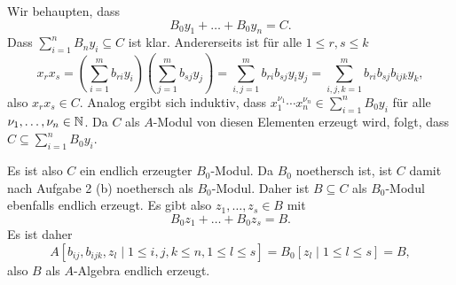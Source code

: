 \documentclass[a4paper,10pt]{article}
\begin{document}
Wir behaupten, dass
\[
 B_0 y_1 + \ldots + B_0 y_n = C.
\]
Dass $\sum_{i=1}^n B_n y_i \subseteq C$ ist klar. Andererseits ist für alle $1 \leq r,s \leq k$
\[
 x_r x_s
 = \left( \sum_{i=1}^m b_{ri} y_i \right) \left( \sum_{j=1}^m b_{sj} y_j \right)
 = \sum_{i,j=1}^m b_{ri} b_{sj} y_i y_j
 = \sum_{i,j,k=1}^m b_{ri} b_{sj} b_{ijk} y_k,
\]
also $x_r x_s \in C$. Analog ergibt sich induktiv, dass $x_1^{\nu_1} \cdots x_n^{\nu_n} \in \sum_{i=1}^n B_0 y_i$ für alle $\nu_1, \ldots, \nu_n \in \mathbb{N}$. Da $C$ als $A$-Modul von diesen Elementen erzeugt wird, folgt, dass $C \subseteq \sum_{i=1}^n B_0 y_i$.

Es ist also $C$ ein endlich erzeugter $B_0$-Modul. Da $B_0$ noethersch ist, ist $C$ damit nach Aufgabe 2 (b) noethersch als $B_0$-Modul. Daher ist $B \subseteq C$ als $B_0$-Modul ebenfalls endlich erzeugt. Es gibt also $z_1, \ldots, z_s \in B$ mit
\[
 B_0 z_1 + \ldots + B_0 z_s = B.
\]
Es ist daher
\[
 A[b_{ij}, b_{ijk}, z_l \mid 1 \leq i,j,k \leq n, 1 \leq l \leq s ]
 = B_0 [z_l \mid 1 \leq l \leq s]
 = B,
\]
also $B$ als $A$-Algebra endlich erzeugt.
\end{document}
